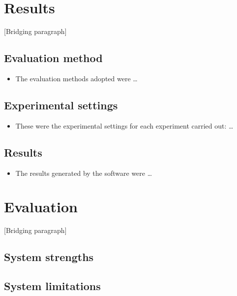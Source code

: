 \documentclass[12pt,a4paper]{article}
\begin{document}
\newpage
\section{Results}
[Bridging paragraph]
\subsection{Evaluation method}
\begin{itemize}
    \item The evaluation methods adopted were \dots
\end{itemize}

\subsection{Experimental settings}
\begin{itemize}
    \item These were the experimental settings for each experiment carried out: \dots
\end{itemize}

\subsection{Results}
\begin{itemize}
    \item The results generated by the software were \dots
\end{itemize}

\newpage
\section{Evaluation}
[Bridging paragraph]
\subsection{System strengths} 

\subsection{System limitations}
\end{document}
